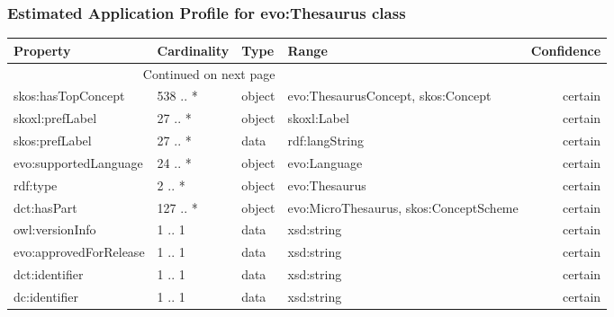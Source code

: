 \documentclass[10pt,a4paper,titlepage,final]{article}
\begin{document}
\subsubsection{Estimated Application Profile for evo:Thesaurus class}
\begin{tabularx}{\textwidth}{lllXr}
\toprule
               Property & Cardinality &    Type &                                   Range & Confidence \\
\midrule
\endhead
\midrule
\multicolumn{3}{r}{{Continued on next page}} \\
\midrule
\endfoot

\bottomrule
\endlastfoot
     skos:hasTopConcept &    538 .. * &  object &      evo:ThesaurusConcept, skos:Concept &    certain \\
        skoxl:prefLabel &     27 .. * &  object &                             skoxl:Label &    certain \\
         skos:prefLabel &     27 .. * &    data &                          rdf:langString &    certain \\
  evo:supportedLanguage &     24 .. * &  object &                            evo:Language &    certain \\
               rdf:type &      2 .. * &  object &                           evo:Thesaurus &    certain \\
            dct:hasPart &    127 .. * &  object &  evo:MicroThesaurus, skos:ConceptScheme &    certain \\
        owl:versionInfo &      1 .. 1 &    data &                              xsd:string &    certain \\
 evo:approvedForRelease &      1 .. 1 &    data &                              xsd:string &    certain \\
         dct:identifier &      1 .. 1 &    data &                              xsd:string &    certain \\
          dc:identifier &      1 .. 1 &    data &                              xsd:string &    certain \\
\end{tabularx}
\end{document}
